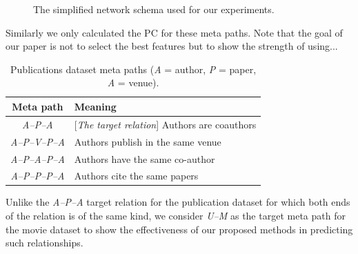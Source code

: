 \begin{figure}[t]
\centering
{}
\caption{The simplified network schema used for our experiments.} \label{Fig:expSchema}
\end{figure}


Similarly we only calculated the PC for these meta paths. Note that the goal of our paper is not to select the best features but to show the strength of using...


\begin{table}[h]
\centering
\caption{Publications dataset meta paths (\textit{A} = author, \textit{P} = paper, \textit{A} = venue).}
\label{table_publications}\scriptsize
\begin{tabular}{|c|l|} \hline
\textbf{Meta path} & \textbf{Meaning} \\ \hline

\textit{A--P--A} & [\textit{The target relation}] Authors are coauthors \\ \hline
\textit{A--P--V--P--A} & Authors publish in the same venue \\ \hline
\textit{A--P--A--P--A} & Authors have the same co-author \\ \hline
\textit{A--P--P--P--A} & Authors cite the same papers \\ \hline

\end{tabular}


\end{table}

Unlike the \textit{A--P--A} target relation for the publication dataset for which both ends of the relation is of the same kind, we consider \textit{U--M} as the target meta path for the movie dataset to show the effectiveness of our proposed methods in predicting such relationships.

